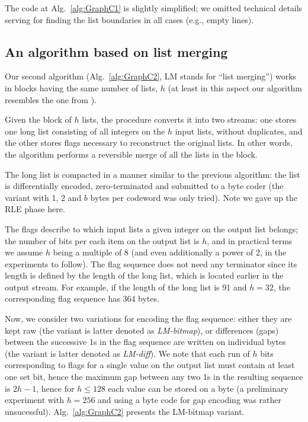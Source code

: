 \documentclass[envcountsame]{llncs}
\begin{document}
The code at Alg.~\ref{alg:GraphC1} is slightly simplified; we omitted technical details 
serving for finding the list boundaries in all cases (e.g., empty lines).


\subsection{An algorithm based on list merging}
\label{sec:sa}


Our second algorithm (Alg.~\ref{alg:GraphC2}, LM stands for ``list merging'') 
works in blocks having the same number of lists, $h$ (at least in this aspect 
our algorithm resembles the one from \cite{DBLP:conf/dcc/AnhM10}).

Given the block of $h$ lists, the procedure converts it into two streams: one stores 
one long list consisting of all integers on the $h$ input lists, without duplicates, 
and the other stores flags necessary to reconstruct the original lists.
In other words, the algorithm performs a reversible merge of all the lists 
in the block.

The long list is compacted in a manner similar to the previous algorithm:
the list is differentially encoded, zero-terminated and submitted to a byte coder 
(the variant with 1, 2 and $b$ bytes per codeword was only tried). Note we gave up 
the RLE phase here.

The flags describe to which input lists a given integer on the output list belongs; 
the number of bits per each item on the output list is $h$, and in practical terms 
we assume $h$ being a multiple of 8 (and even additionally a power of 2, in the 
experiments to follow). 
The flag sequence does not need any terminator since its length is defined by the 
length of the long list, which is located earlier in the output stream.
For example, if the length of the long list is 91 and $h=32$, the corresponding 
flag sequence has 364 bytes.

Now, we consider two variations for encoding the flag sequence:
either they are kept raw (the variant is latter denoted as {\em LM-bitmap}), 
or differences (gaps) between the successive 1s in the flag sequence are written 
on individual bytes (the variant is latter denoted as {\em LM-diff}).
We note that each run of $h$ bits corresponding to flags for a single value on the 
output list must contain at least one set bit, hence the maximum gap 
between any two 1s in the resulting sequence is $2h - 1$, hence for $h \leq 128$ 
each value can be stored on a byte 
(a preliminary experiment with $h = 256$ and using a byte code for gap encoding 
was rather unsucessful).
Alg.~\ref{alg:GraphC2} presents the LM-bitmap variant.
\end{document}
